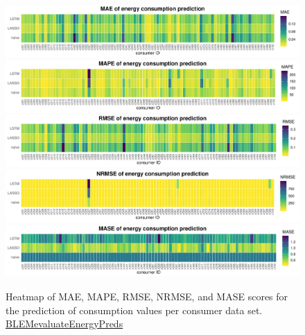 %
\begin{figure}[htbp]
 \centering
 \includegraphics[width=\textwidth]{thesis/graphs/evaluation/c_heatmap_MAE.pdf}
 \includegraphics[width=\textwidth]{thesis/graphs/evaluation/c_heatmap_MAPE.pdf}
 \includegraphics[width=\textwidth]{thesis/graphs/evaluation/c_heatmap_RMSE.pdf}
 \includegraphics[width=\textwidth]{thesis/graphs/evaluation/c_heatmap_NRMSE.pdf}
 \includegraphics[width=\textwidth]{thesis/graphs/evaluation/c_heatmap_MASE.pdf}
\caption[Heatmaps of all error measures for consumption values]{Heatmap of MAE, MAPE, RMSE, NRMSE, and MASE scores for the prediction of consumption values per consumer data set. \quantnet\href{https://github.com/QuantLet/BLEM/tree/master/BLEMevaluateEnergyPreds}{BLEMevaluateEnergyPreds}}
\label{Fig:heatmaps}
\end{figure}
%

